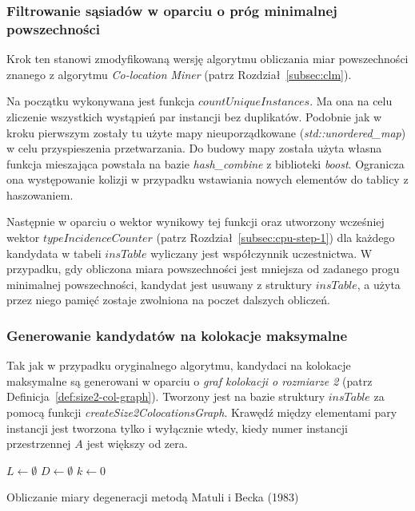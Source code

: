 \documentclass[12pt]{article}
\makeatletter
\newcounter{algorytm}
\newenvironment{algorytm}[1][htb]
  {
  \renewcommand*{\algorithmcfname}{Algorytm}%
  \let\c@algocf\c@algorytm
   \begin{algorithm}[#1]
  }
  {\end{algorithm}}
\makeatother
\begin{document}
\subsubsection{Filtrowanie sąsiadów w oparciu o próg minimalnej powszechności}

Krok ten stanowi zmodyfikowaną wersję algorytmu obliczania miar powszechności znanego z algorytmu \textit{Co-location Miner} (patrz Rozdział~\ref{subsec:clm}).

Na początku wykonywana jest funkcja $ countUniqueInstances$. Ma ona na celu zliczenie wszystkich wystąpień par instancji bez duplikatów. Podobnie jak w kroku pierwszym zostały tu użyte mapy nieuporządkowane (\textit{std::unordered\_map}) w celu przyspieszenia przetwarzania. Do budowy mapy została użyta własna funkcja mieszająca powstała na bazie \textit{hash\_combine} z biblioteki \textit{boost}. Ogranicza ona występowanie kolizji w przypadku wstawiania nowych elementów do tablicy z haszowaniem.

Następnie w oparciu o wektor wynikowy tej funkcji oraz utworzony wcześniej wektor $ typeIncidenceCounter$ (patrz Rozdział~\ref{subsec:cpu-step-1}) dla każdego kandydata w tabeli $ insTable $ wyliczany jest współczynnik uczestnictwa. W przypadku, gdy obliczona miara powszechności jest mniejsza od zadanego progu minimalnej powszechności, kandydat jest usuwany z struktury $ insTable $, a użyta przez niego pamięć zostaje zwolniona na poczet dalszych obliczeń.

\subsubsection{Generowanie kandydatów na kolokacje maksymalne}

Tak jak w przypadku oryginalnego algorytmu, kandydaci na kolokacje maksymalne są generowani w oparciu o \textit{graf kolokacji o rozmiarze 2} (patrz Definicja~\ref{def:size2-col-graph}). Tworzony jest na bazie struktury $ insTable $ za pomocą funkcji \textit{createSize2ColocationsGraph}. Krawędź między elementami pary instancji jest tworzona tylko i wyłącznie wtedy, kiedy numer instancji przestrzennej $ A $ jest większy od zera. 

\begin{algorytm}
$L \leftarrow \emptyset$\; 
$D \leftarrow \emptyset$\;
$k \leftarrow 0$\;
\caption{Obliczanie miary degeneracji metodą Matuli i Becka (1983)}
\label{alg:matusiak}
\end{algorytm}
\end{document}
